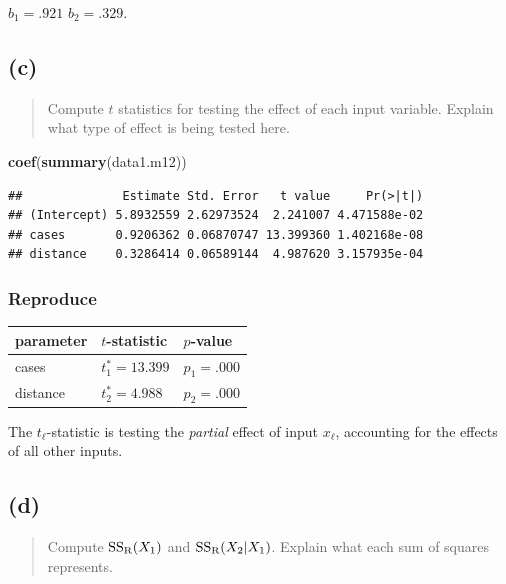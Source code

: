 \documentclass[
]{article}
\newenvironment{Shaded}{\begin{snugshade}}{\end{snugshade}}
\newcommand{\FunctionTok}[1]{\textcolor[rgb]{0.13,0.29,0.53}{\textbf{#1}}}
\newcommand{\NormalTok}[1]{#1}
\begin{document}
\(b_1 = .921\) \(b_2 = .329\).

\hypertarget{c}{%
\subsection{(c)}\label{c}}

\begin{quote}
Compute \(t\) statistics for testing the effect of each input variable.
Explain what type of effect is being tested here.
\end{quote}

\begin{Shaded}
\begin{Highlighting}[]
\FunctionTok{coef}\NormalTok{(}\FunctionTok{summary}\NormalTok{(data1.m12))}
\end{Highlighting}
\end{Shaded}

\begin{verbatim}
##              Estimate Std. Error   t value     Pr(>|t|)
## (Intercept) 5.8932559 2.62973524  2.241007 4.471588e-02
## cases       0.9206362 0.06870747 13.399360 1.402168e-08
## distance    0.3286414 0.06589144  4.987620 3.157935e-04
\end{verbatim}

\hypertarget{reproduce-2}{%
\subsubsection{Reproduce}\label{reproduce-2}}

\begin{longtable}[]{@{}lll@{}}
\toprule\noalign{}
parameter & \(t\)-statistic & \(p\)-value \\
\midrule\noalign{}
\endhead
\bottomrule\noalign{}
\endlastfoot
cases & \(t_1^*=13.399\) & \(p_1=.000\) \\
distance & \(t_2^*=4.988\) & \(p_2=.000\) \\
\end{longtable}

The \(t_\ell\)-statistic is testing the \emph{partial} effect of input
\(x_\ell\), accounting for the effects of all other inputs.

\hypertarget{d}{%
\subsection{(d)}\label{d}}

\begin{quote}
Compute \(\mathrm{SS_{R}}(X_1)\) and \(\mathrm{SS_{R}}(X_2|X_1)\). Explain what each sum
of squares represents.
\end{quote}
\end{document}
